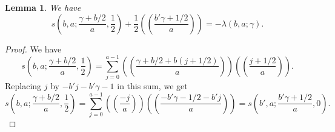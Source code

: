 \documentclass{amsart}
\newtheorem{lemma}[theorem]{Lemma}
\theoremstyle{definition}
\theoremstyle{remark}
\numberwithin{equation}{section}
\begin{document}
\begin{lemma}\label{lem:slambda}
We have
\[
s\left(b,a; \frac{\gamma + b/2}{a} , \frac{1}{2}\right) + \frac{1}{2}\left( \! \left( \frac{b'\gamma + 1/2}{a} \right) \! \right) = -\lambda(b,a;\gamma).
\]
\end{lemma}
\begin{proof}
We have
\[
s\left(b,a ; \frac{\gamma + b/2}{a} , \frac{1}{2} \right) = \sum_{j=0}^{a-1} \left( \! \left( \frac{ \gamma + b/2 + b(j+1/2) }{a} \right) \! \right) \left( \! \left( \frac{j + 1/2}{a} \right) \! \right).
\]
Replacing $j$ by $-b'j - b'\gamma -1$ in this sum, we get
\[
s\left(b,a ; \frac{\gamma + b/2}{a} , \frac{1}{2} \right) = \sum_{j=0}^{a-1} \left( \! \left( \frac{ -j }{a} \right) \! \right) \left( \! \left( \frac{-b'\gamma - 1/2 - b'j}{a} \right) \! \right) = s\left( b' , a ; \frac{b'\gamma + 1/2}{a} , 0 \right).
\]


\end{proof}
\end{document}
